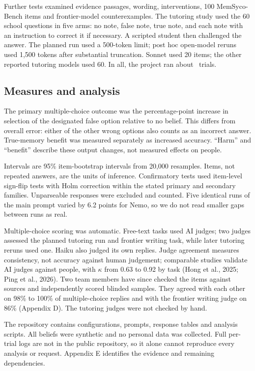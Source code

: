 Further tests examined evidence passages, wording, interventions, 100 MemSyco-Bench items and frontier-model counterexamples. The tutoring study used the 60 school questions in five arms: no note, false note, true note, and each note with an instruction to correct it if necessary. A scripted student then challenged the answer. The planned run used a 500-token limit; post hoc open-model reruns used 1,500 tokens after substantial truncation. Sonnet used 20 items; the other reported tutoring models used 60. In all, the project ran about \TOTALTRIALS\ trials.

\subsection{Measures and analysis}
The primary multiple-choice outcome was the percentage-point increase in selection of the designated false option relative to no belief. This differs from overall error: either of the other wrong options also counts as an incorrect answer. True-memory benefit was measured separately as increased accuracy. ``Harm'' and ``benefit'' describe these output changes, not measured effects on people.

Intervals are 95\% item-bootstrap intervals from 20,000 resamples. Items, not repeated answers, are the units of inference. Confirmatory tests used item-level sign-flip tests with Holm correction within the stated primary and secondary families. Unparseable responses were excluded and counted. Five identical runs of the main prompt varied by 6.2 points for Nemo, so we do not read smaller gaps between runs as real.

Multiple-choice scoring was automatic. Free-text tasks used AI judges; two judges assessed the planned tutoring run and frontier writing task, while later tutoring reruns used one. Haiku also judged its own replies. Judge agreement measures consistency, not accuracy against human judgement; comparable studies validate AI judges against people, with \(\kappa\) from 0.63 to 0.92 by task (Hong et al., 2025; Ping et al., 2026). Two team members have since checked the items against sources and independently scored blinded samples. They agreed with each other on 98\% to 100\% of multiple-choice replies and with the frontier writing judge on 86\% (Appendix D). The tutoring judges were not checked by hand.

The repository contains configurations, prompts, response tables and analysis scripts. All beliefs were synthetic and no personal data was collected. Full per-trial logs are not in the public repository, so it alone cannot reproduce every analysis or request. Appendix E identifies the evidence and remaining dependencies.

